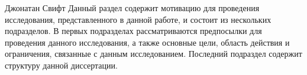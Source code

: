 \hfill {}

\hfill Джонатан Свифт
Данный раздел содержит мотивацию для проведения исследования, представленного в данной работе, 
и состоит из нескольких подразделов.
В первых подразделах рассматриваются предпосылки для проведения данного исследования, а также 
основные цели, область действия и ограничения, связанные с данным исследованием.
Последний подраздел содержит структуру данной диссертации.